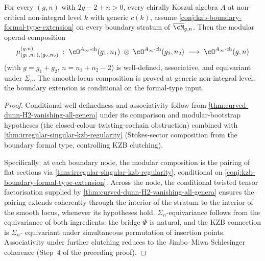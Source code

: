 \begin{corollary}
\label{cor:modular-operad-composition-all-levels}
\ClaimStatusConditional
For every \((g, n)\) with \(2g - 2 + n > 0\), every chirally Koszul
algebra \(A\) at non-critical non-integral level \(k\) with
generic \(c(k)\), assume
\autoref{conj:kzb-boundary-formal-type-extension} on every
boundary stratum of \(\overline{\cM}_{g,n}\). Then the modular
operad composition
\[
 \mu_{(g_{1},n_{1}),(g_{2},n_{2})}^{(g,n)}\;:\;
 \cO^{A_{\infty}\text{-ch}}(g_{1}, n_{1})
 \;\otimes\;
 \cO^{A_{\infty}\text{-ch}}(g_{2}, n_{2})
 \;\longrightarrow\;
 \cO^{A_{\infty}\text{-ch}}(g, n)
\]
(with \(g = g_{1} + g_{2}\), \(n = n_{1} + n_{2} - 2\)) is
well-defined, associative, and equivariant under \(\Sigma_{n}\).
The smooth-locus composition is proved at generic non-integral
level; the boundary extension is conditional on the formal-type
input.
\end{corollary}

\begin{proof}
Conditional well-definedness and associativity follow from
\autoref{thm:curved-dunn-H2-vanishing-all-genera} under its
comparison and modular-bootstrap hypotheses (the closed-colour
twisting-cochain obstruction) combined with
\autoref{thm:irregular-singular-kzb-regularity} (Stokes-sector
composition from the boundary formal type, controlling KZB
clutching).

Specifically: at each boundary node, the modular composition is
the pairing of flat sections via
\autoref{thm:irregular-singular-kzb-regularity}, conditional on
\autoref{conj:kzb-boundary-formal-type-extension}. Across the node,
the conditional twisted tensor factorisation supplied by
\autoref{thm:curved-dunn-H2-vanishing-all-genera} ensures the
pairing extends coherently through the interior of the stratum to
the interior of the smooth locus, whenever its hypotheses hold.
\(\Sigma_{n}\)-equivariance
follows from the equivariance of both ingredients: the bridge
\(\Phi\) is natural, and the KZB connection is \(\Sigma_{n}\)-
equivariant under simultaneous permutation of insertion points.
Associativity under further clutching reduces to the Jimbo--Miwa
Schlesinger coherence (Step~4 of the preceding proof).
\end{proof}

